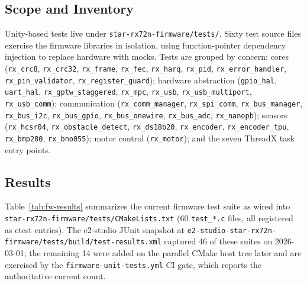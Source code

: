 \documentclass[11pt,letterpaper]{article}
\begin{document}
\subsection{Scope and Inventory}
Unity-based tests live under
\texttt{star-rx72n-firmware/tests/}. Sixty test source files exercise
the firmware libraries in isolation, using function-pointer dependency
injection to replace hardware with mocks. Tests are grouped by
concern: cores (\texttt{rx\_crc8}, \texttt{rx\_crc32},
\texttt{rx\_frame}, \texttt{rx\_fec}, \texttt{rx\_harq},
\texttt{rx\_pid}, \texttt{rx\_error\_handler},
\texttt{rx\_pin\_validator}, \texttt{rx\_register\_guard});
hardware abstraction
(\texttt{gpio\_hal}, \texttt{uart\_hal}, \texttt{rx\_gptw\_staggered},
\texttt{rx\_mpc}, \texttt{rx\_usb}, \texttt{rx\_usb\_multiport},
\texttt{rx\_usb\_comm});
communication (\texttt{rx\_comm\_manager}, \texttt{rx\_spi\_comm},
\texttt{rx\_bus\_manager}, \texttt{rx\_bus\_i2c},
\texttt{rx\_bus\_gpio}, \texttt{rx\_bus\_onewire},
\texttt{rx\_bus\_adc}, \texttt{rx\_nanopb});
sensors (\texttt{rx\_hcsr04}, \texttt{rx\_obstacle\_detect},
\texttt{rx\_ds18b20}, \texttt{rx\_encoder},
\texttt{rx\_encoder\_tpu}, \texttt{rx\_bmp280},
\texttt{rx\_bno055}); motor control (\texttt{rx\_motor}); and the
seven ThreadX task entry points.

\subsection{Results}
Table~\ref{tab:fw-results} summarizes the current firmware test
suite as wired into \texttt{star-rx72n-firmware/tests/CMakeLists.txt}
(60 \texttt{test\_*.c} files, all registered as ctest entries). The
e2-studio JUnit snapshot at
\texttt{e2-studio-star-rx72n-firmware/tests/build/test-results.xml}
captured 46 of these suites on 2026-03-01; the remaining 14 were
added on the parallel CMake host tree later and are exercised by
the \texttt{firmware-unit-tests.yml} CI gate, which reports the
authoritative current count.
\end{document}

